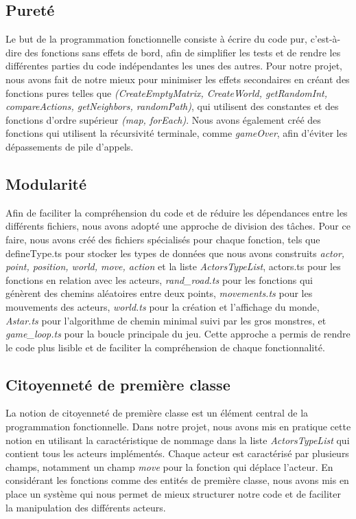 \documentclass[11pt]{article}
\begin{document}
        \subsection{Pureté}
        Le but de la programmation fonctionnelle consiste à écrire du code pur, c'est-à-dire des fonctions sans effets de bord, afin de simplifier les tests et de rendre les différentes parties du code indépendantes les unes des autres. Pour notre projet, nous avons fait de notre mieux pour minimiser les effets secondaires en créant des fonctions pures telles que \textit{(CreateEmptyMatrix, CreateWorld, getRandomInt, compareActions, getNeighbors, randomPath)}, qui utilisent des constantes et des fonctions d'ordre supérieur \textit{(map, forEach)}. Nous avons également créé des fonctions qui utilisent la récursivité terminale, comme \textit{gameOver}, afin d'éviter les dépassements de pile d'appels.
        \subsection{Modularité}
       Afin de faciliter la compréhension du code et de réduire les dépendances entre les différents fichiers, nous avons adopté une approche de division des tâches. Pour ce faire, nous avons créé des fichiers spécialisés pour chaque fonction, tels que defineType.ts pour stocker les types de données que nous avons construits \textit{actor, point, position, world, move, action} et la liste \textit{ActorsTypeList}, actors.ts pour les fonctions en relation avec les acteurs, \textit{rand\_road.ts} pour les fonctions qui génèrent des chemins aléatoires entre deux points, \textit{movements.ts} pour les mouvements des acteurs, \textit{world.ts} pour la création et l'affichage du monde, \textit{Astar.ts} pour l'algorithme de chemin minimal suivi par les gros monstres, et \textit{game\_loop.ts} pour la boucle principale du jeu. Cette approche a permis de rendre le code plus lisible et de faciliter la compréhension de chaque fonctionnalité.
        \subsection{Citoyenneté de première classe}
        La notion de citoyenneté de première classe est un élément central de la programmation fonctionnelle. Dans notre projet, nous avons mis en pratique cette notion en utilisant la caractéristique de nommage dans la liste \textit{ActorsTypeList} qui contient tous les acteurs implémentés. Chaque acteur est caractérisé par plusieurs champs, notamment un champ \textit{move} pour la fonction qui déplace l'acteur. En considérant les fonctions comme des entités de première classe, nous avons mis en place un système qui nous permet de mieux structurer notre code et de faciliter la manipulation des différents acteurs.
\end{document}
